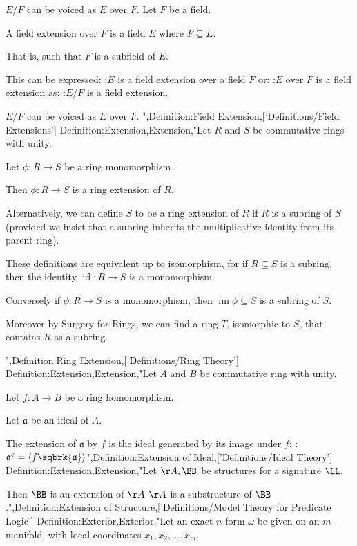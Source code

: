$E / F$ can be voiced as $E$ over $F$.
Let $F$ be a field.


A field extension over $F$ is a field $E$ where $F \subseteq E$.

That is, such that $F$ is a subfield of $E$.


This can be expressed:
:$E$ is a field extension over a field $F$
or:
:$E$ over $F$ is a field extension 
as:
:$E / F$ is a field extension.  


$E / F$ can be voiced as $E$ over $F$.
",Definition:Field Extension,['Definitions/Field Extensions']
Definition:Extension,Extension,"Let $R$ and $S$ be commutative rings with unity.

Let $\phi : R \to S$ be a ring monomorphism.

Then $\phi : R \to S$ is a ring extension of $R$.


Alternatively, we can define $S$ to be a ring extension of $R$ if $R$ is a subring of $S$ (provided we insist that a subring inherits the multiplicative identity from its parent ring).


These definitions are equivalent up to isomorphism, for if $R \subseteq S$ is a subring, then the identity $\operatorname{id} : R \to S$ is a monomorphism.

Conversely if $\phi : R \to S$ is a monomorphism, then $\operatorname{im}\phi \subseteq S$ is a subring of $S$.

Moreover by Surgery for Rings, we can find a ring $T$, isomorphic to $S$, that contains $R$ as a subring.

",Definition:Ring Extension,['Definitions/Ring Theory']
Definition:Extension,Extension,"Let $A$ and $B$ be commutative ring with unity.

Let $f : A \to B$ be a ring homomorphism.

Let $\mathfrak a$ be an ideal of $A$.


The extension of $\mathfrak a$ by $f$ is the ideal generated by its image under $f$:
:$\mathfrak a^e = \left\langle f \sqbrk {\mathfrak a} \right\rangle$",Definition:Extension of Ideal,['Definitions/Ideal Theory']
Definition:Extension,Extension,"Let $\AA, \BB$ be structures for a signature $\LL$.


Then $\BB$ is an extension of $\AA$  $\AA$ is a substructure of $\BB$.",Definition:Extension of Structure,['Definitions/Model Theory for Predicate Logic']
Definition:Exterior,Exterior,"Let an exact $n$-form $\omega$ be given on an $m$-manifold, with local coordinates $x_1, x_2, \dots, x_m$.

